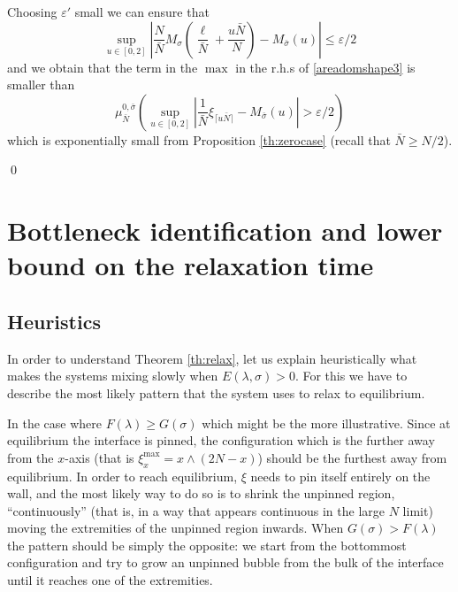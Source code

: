\documentclass[reqno,11pt]{amsart}
\numberwithin{equation}{section}
\newcommand{\gep}{\varepsilon}       %
\newcommand{\gl}{\lambda}
\newcommand{\gs}{\sigma}
\begin{document}
Choosing $\gep'$ small we can ensure that 
\begin{equation}
\sup_{u \in [0, 2]} \left|  \frac{N}{\bar N}M_{\gs}\left( \frac{\ell}{\bar N}+\frac{u \bar N}{N}  \right)- M_{\bar \gs}(u) \right| \le \gep/2
\end{equation}
and we obtain that the term in the $\max$ in the r.h.s of \eqref{areadomshape3} is smaller than
\begin{equation}
 \mu_{\bar N}^{0,\bar \gs} \left( \sup_{u \in [0, 2]} \left| \frac{1}{\bar N}\xi_{\lceil u \bar N \rceil}-  M_{\bar \gs}(u) \right| > \gep/2 \right)
\end{equation}
which is exponentially small from Proposition \ref{th:zerocase} (recall that $\bar N\ge N/2$).

\qed


\section{Bottleneck identification and lower bound on the relaxation time}\label{sec:lowbrel}

\subsection{Heuristics}\label{heuristicz}

In order to understand Theorem \ref{th:relax}, let us explain heuristically what makes the systems mixing slowly when $E(\gl,\sigma)>0$. 
For this we have to describe the most likely pattern that the system uses to relax to equilibrium.

\medskip 

In the case where $F(\gl)\ge G(\sigma)$ which might be the more illustrative.
Since at equilibrium the interface is pinned, the configuration which is the further away from the $x$-axis (that is $\xi^{\max}_x=x \wedge (2N-x)$) should be the furthest away from equilibrium.
In order to reach equilibrium, $\xi$ needs to pin itself entirely on the wall, and the most likely way to do so is to shrink the unpinned region, ``continuously'' (that is, in a way that appears continuous in the large $N$ limit) moving the extremities of the unpinned region inwards. When $G(\sigma)>F(\gl)$ the pattern should be simply the opposite: we start from the bottommost configuration and try to grow an unpinned bubble from the bulk of the interface until it reaches one of the extremities.

\medskip
\end{document}
